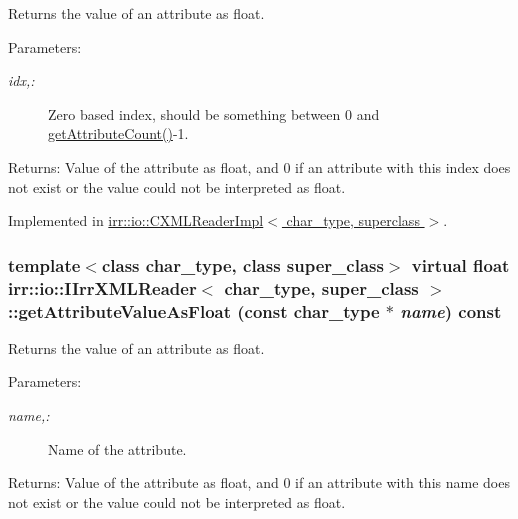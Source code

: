 Returns the value of an attribute as float. 

\begin{Desc}
\item[Parameters:]
\begin{description}
\item[{\em idx,:}]Zero based index, should be something between 0 and \hyperlink{classirr_1_1io_1_1_i_irr_x_m_l_reader_eaa1cfc860be7b788f78edec403cc2a2}{getAttributeCount()}-1. \end{description}
\end{Desc}
\begin{Desc}
\item[Returns:]Value of the attribute as float, and 0 if an attribute with this index does not exist or the value could not be interpreted as float. \end{Desc}


Implemented in \hyperlink{classirr_1_1io_1_1_c_x_m_l_reader_impl_14d3f55dd2260b970525336713b8270e}{irr::io::CXMLReaderImpl$<$ char\_\-type, superclass $>$}.\hypertarget{classirr_1_1io_1_1_i_irr_x_m_l_reader_2b1032f213e9910827842f6057269235}{
\subsubsection[{getAttributeValueAsFloat}]{\setlength{\rightskip}{0pt plus 5cm}template$<$class char\_\-type, class super\_\-class$>$ virtual float {\bf irr::io::IIrrXMLReader}$<$ char\_\-type, super\_\-class $>$::getAttributeValueAsFloat (const char\_\-type $\ast$ {\em name}) const}}
\label{classirr_1_1io_1_1_i_irr_x_m_l_reader_2b1032f213e9910827842f6057269235}


Returns the value of an attribute as float. 

\begin{Desc}
\item[Parameters:]
\begin{description}
\item[{\em name,:}]Name of the attribute. \end{description}
\end{Desc}
\begin{Desc}
\item[Returns:]Value of the attribute as float, and 0 if an attribute with this name does not exist or the value could not be interpreted as float. \end{Desc}


